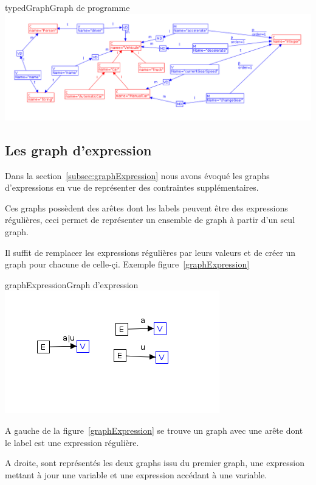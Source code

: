 \documentclass[a4paper, 12pt]{article}
\begin{document}
  \begin{myfig}{typedGraph}{Graph de programme}
    \includegraphics[width=\textwidth]{typedGraph.png}
  \end{myfig}

  \subsection{Les graph d'expression}

  Dans la section~\ref{subsec:graphExpression} nous avons évoqué les graphs d'expressions en vue de représenter des contraintes supplémentaires.

  Ces graphs possèdent des arêtes dont les labels peuvent être des expressions régulières, ceci permet de représenter un ensemble de graph à partir d'un seul graph.

  Il suffit de remplacer les expressions régulières par leurs valeurs et de créer un graph pour chacune de celle-çi. Exemple figure~\ref{graphExpression}

  \begin{myfig}{graphExpression}{Graph d'expression}
    \includegraphics{graphExpression.png}
  \end{myfig}

  A gauche de la figure~\ref{graphExpression} se trouve un graph avec une arête dont le label est une expression régulière.

  A droite, sont représentés les deux graphs issu du premier graph, une expression mettant à jour une variable et une expression accédant à une variable.
\end{document}
